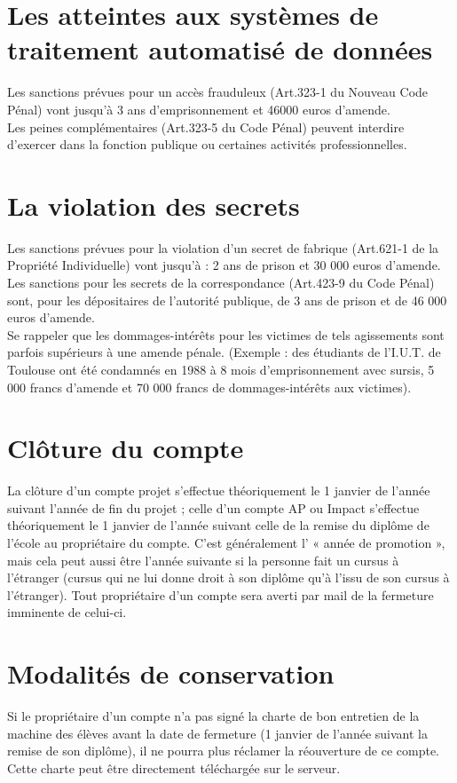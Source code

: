 \documentclass[10pt,a4paper]{article}
\begin{document}
\section{Les atteintes aux systèmes de traitement automatisé de données}
Les sanctions prévues pour un accès frauduleux (Art.323-1 du Nouveau Code Pénal) vont jusqu'à 3 ans d'emprisonnement et 46000 euros d'amende.\\
Les peines complémentaires (Art.323-5 du Code Pénal) peuvent interdire d'exercer dans la fonction publique ou certaines activités professionnelles.

\section{La violation des secrets}
Les sanctions prévues pour la violation d'un secret de fabrique (Art.621-1 de la Propriété Individuelle) vont jusqu'à : 2 ans de prison et 30 000 euros d'amende. Les sanctions pour les secrets de la correspondance (Art.423-9 du Code Pénal) sont, pour les dépositaires de l'autorité publique, de 3 ans de prison et de 46 000 euros d'amende.\\

Se rappeler que les dommages-intérêts pour les victimes de tels agissements sont parfois supérieurs à une amende pénale. (Exemple : des étudiants de l'I.U.T. de Toulouse ont été condamnés en 1988 à 8 mois d'emprisonnement avec sursis, 5 000 francs d'amende et 70 000 francs de dommages-intérêts aux victimes).

\section{Clôture du compte}
La clôture d'un compte projet s'effectue théoriquement le 1 janvier de l'année suivant l'année de fin du projet ; celle d'un compte AP ou Impact s'effectue théoriquement le 1 janvier de l'année suivant celle de la remise du diplôme de l'école au propriétaire du compte. C'est
généralement l' « année de promotion », mais cela peut aussi être l'année suivante si la personne fait un cursus à l'étranger (cursus qui ne lui donne droit à son diplôme qu'à l'issu de son cursus à l'étranger). Tout propriétaire d'un compte sera averti par mail de la fermeture imminente de celui-ci.

\section{Modalités de conservation}
Si le propriétaire d'un compte n'a pas signé la charte de bon entretien de la machine des élèves avant la date de fermeture (1 janvier de l'année suivant la remise de son diplôme), il ne pourra plus réclamer la réouverture de ce compte. Cette charte peut être directement téléchargée sur le serveur.
\end{document}
